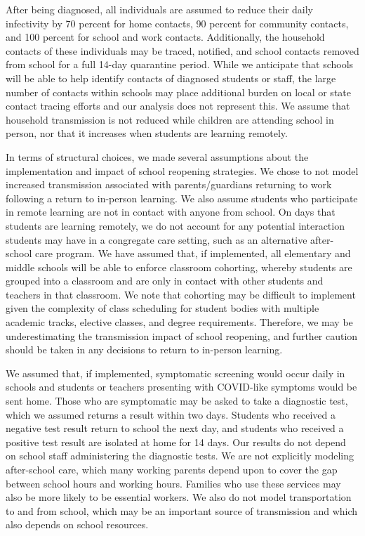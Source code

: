 \documentclass[preprint,12pt]{elsarticle}
\begin{document}
After being diagnosed, all individuals are assumed to reduce their daily infectivity by 70 percent for home contacts, 90 percent for community contacts, and 100 percent for school and work contacts. Additionally, the household contacts of these individuals may be traced, notified, and school contacts removed from school for a full 14-day quarantine period. While we anticipate that schools will be able to help identify contacts of diagnosed students or staff, the large number of contacts within schools may place additional burden on local or state contact tracing efforts and our analysis does not represent this. We assume that household transmission is not reduced while children are attending school in person, nor that it increases when students are learning remotely.

In terms of structural choices, we made several assumptions about the implementation and impact of school reopening strategies. We chose to not model increased transmission associated with parents/guardians returning to work following a return to in-person learning. We also assume students who participate in remote learning are not in contact with anyone from school. On days that students are learning remotely, we do not account for any potential interaction students may have in a congregate care setting, such as an alternative after-school care program. We have assumed that, if implemented, all elementary and middle schools will be able to enforce classroom cohorting, whereby students are grouped into a classroom and are only in contact with other students and teachers in that classroom. We note that cohorting may be difficult to implement given the complexity of class scheduling for student bodies with multiple academic tracks, elective classes, and degree requirements. Therefore, we may be underestimating the transmission impact of school reopening, and further caution should be taken in any decisions to return to in-person learning.

We assumed that, if implemented, symptomatic screening would occur daily in schools and students or teachers presenting with COVID-like symptoms would be sent home. Those who are symptomatic may be asked to take a diagnostic test, which we assumed returns a result within two days. Students who received a negative test result return to school the next day, and students who received a positive test result are isolated at home for 14 days. Our results do not depend on school staff administering the diagnostic tests. We are not explicitly modeling after-school care, which many working parents depend upon to cover the gap between school hours and working hours. Families who use these services may also be more likely to be essential workers. We also do not model transportation to and from school, which may be an important source of transmission and which also depends on school resources.
\end{document}
